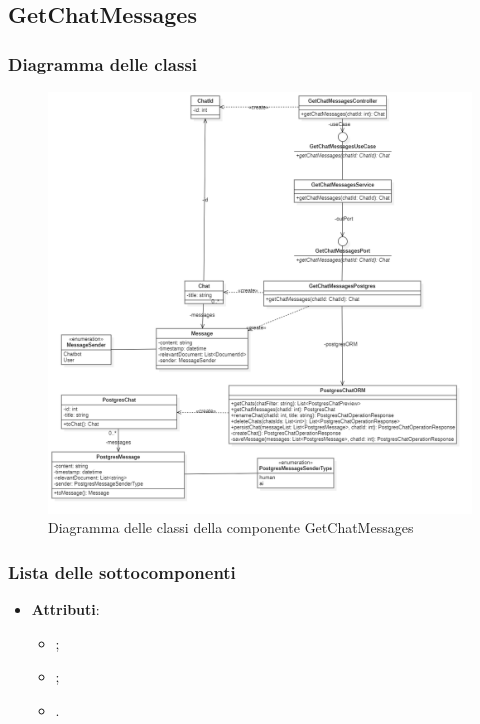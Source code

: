 \documentclass[10pt, a4paper]{article}
\begin{document}
\subsection{GetChatMessages}
\subsubsection{Diagramma delle classi}

    \begin{figure}[H]
    \centering        
    \includegraphics[width=16.5cm]{img/GetChatMessages.png}
    \caption{Diagramma delle classi della componente GetChatMessages}
\end{figure}
\subsubsection{Lista delle sottocomponenti}




\label{ChatDettaglio}
\begin{itemize}
    \item \textbf{Attributi}:
    \begin{itemize}
        \item {};
        \item {};
        \item {}.
    \end{itemize}
\end{itemize}
\end{document}
